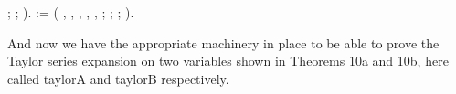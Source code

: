 \documentclass[11pt,twocolumn]{article}
\begin{document}
\begin{coqdoccode}
\coqdocindent{3.50em}
; ;\coqdoceol
\coqdocindent{3.50em}
).\coqdoceol
\coqdocemptyline
\coqdocnoindent
{}        :=\coqdoceol
\coqdocindent{1.00em}
 ( , , , , , ;\coqdoceol
\coqdocindent{3.50em}
; ;\coqdoceol
\coqdocindent{3.50em}
).\coqdoceol
\coqdocemptyline
\end{coqdoccode}


And now we have the appropriate machinery in place to be able to prove
the Taylor series expansion on two variables shown in Theorems 10a and
10b, here called taylorA and taylorB respectively.
\end{document}
